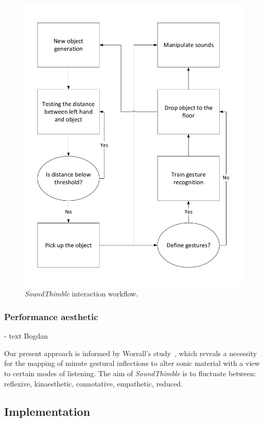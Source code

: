 \documentclass{nime-alternate}
\begin{document}
\begin{figure}[t]
	\centering
	\includegraphics[width=.65\columnwidth]{img/concept}
	\caption{\textit{SoundThimble} interaction workflow.}
	\label{fig:concept}
\end{figure}

\subsubsection{Performance aesthetic}

- text Bogdan

Our present approach is informed by Worrall's study~\cite{worrall2013understanding}, which reveals a necessity for the mapping of minute gestural inflections to alter sonic material with a view to certain modes of listening. The aim of \textit{SoundThimble} is to fluctuate between: reflexive, kinaesthetic, connotative, empathetic, reduced.

\subsection{Implementation}

\end{document}
